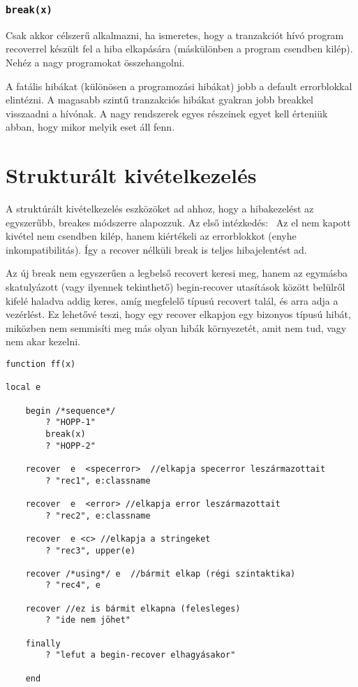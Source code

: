 \subsubsection{\tt break(x)}

Csak akkor célszerű alkalmazni, ha ismeretes, hogy a tranzakciót 
hívó program recoverrel készült fel a hiba elkapására (máskülönben 
a program csendben kilép). Nehéz a nagy programokat összehangolni.

A fatális hibákat (különösen a programozási hibákat)  jobb 
a default error\-blokkal elintézni. A magasabb szintű tranzakciós 
hibákat gyakran jobb breakkel visszaadni a hívónak. A nagy 
rendszerek egyes részeinek egyet kell érteniük abban, hogy 
mikor melyik eset áll fenn.


\section{Strukturált kivételkezelés}

A struktúrált kivételkezelés eszközöket ad ahhoz, hogy a hibakezelést
az egyszerűbb, breakes módszerre alapozzuk.
Az első intézkedés:~
Az el nem kapott kivétel nem csendben kilép,
hanem  kiértékeli az errorblokkot (enyhe inkompatibilitás).
Így a recover nélküli break is teljes hibajelentést ad.

Az új break nem egyszerűen a legbelső recovert keresi meg,
hanem az egymásba skatulyázott (vagy ilyennek tekinthető)
begin-recover utasítások között belülről kifelé haladva addig keres, 
amíg megfelelő típusú recovert talál, és arra adja a vezérlést. 
Ez lehetővé teszi, hogy egy recover elkapjon egy bizonyos típusú hibát, 
miközben nem semmisíti meg más olyan hibák környezetét, amit nem tud,
vagy nem akar kezelni.


\begin{verbatim}
function ff(x)

local e

    begin /*sequence*/
        ? "HOPP-1"
        break(x)
        ? "HOPP-2"

    recover  e  <specerror>  //elkapja specerror leszármazottait
        ? "rec1", e:classname

    recover  e  <error> //elkapja error leszármazottait
        ? "rec2", e:classname

    recover  e <c> //elkapja a stringeket
        ? "rec3", upper(e)

    recover /*using*/ e  //bármit elkap (régi szintaktika)
        ? "rec4", e

    recover //ez is bármit elkapna (felesleges) 
        ? "ide nem jöhet"

    finally
        ? "lefut a begin-recover elhagyásakor"

    end 
\end{verbatim}


